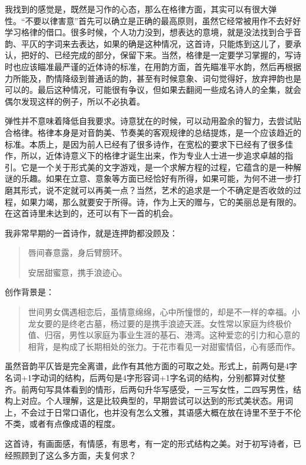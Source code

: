 \documentclass{article}
\begin{document}
我找到的感觉是，既然是习作的心态，那么在格律方面，其实可以有很大弹性。``不要以律害意''首先可以确立是正确的最高原则，虽然它经常被用作不去好好学习格律的借口。很多时候，个人功力没到，想表达的意境，就是没法找到合乎音韵、平仄的字词来去表达，如果的确是这种情况，这首诗，只能炼到这儿了，要承认，把好的、已经完成的部分，保留下来。当然，格律是一定要学习掌握的，写诗时也应该瞄准最严谨的近体诗的标准，在用韵方面，首先瞄准平水韵，然后再根据力所能及，酌情降级到普通话的韵，甚至有时候意象、词句觉得好，放弃押韵也是可以的。最后这种情况，可能很有争议，但如果去翻阅一些成名诗人的全集，就会偶尔发现这样的例子，所以不必执着。

弹性并不意味着降低自我要求。诗意犹在的时候，可以动用盈余的智力，去尝试贴合格律。格律本身是对音韵美、节奏美的客观规律的总结提炼，是一个应该趋近的标准。本质上，是因为前人已经有了很多诗作，在宽松的要求下已经有了很多佳作，所以，近体诗意义下的格律才诞生出来，作为专业人士进一步追求卓越的指引。它是一个关于形式美的文字游戏，是一个求解方程的过程，它蕴含的是一种解谜的乐趣。如果在立意、意象等方面已经恰好有所得，如果可能，为何不进一步打磨其形式，说不定就可以再美一点？当然，艺术的追求是一个不确定是否收敛的过程，如果力竭，那么就要安于所得。诗，作为上天的赠与，它的美丽总是有限的。在这首诗里未达到的，还可以有下一首的机会。

我非常早期的一首诗作，就是连押韵都没顾及：

\begin{quote}
唇间春意露，身后臂膀环。

安居甜蜜意，携手浪迹心。
\end{quote}

创作背景是：

\begin{quote}
世间男女偶遇相恋后，虽情意绵绵，心中所憧憬的，却是不一样的幸福。小龙女要的是终老古墓，杨过要的是携手浪迹天涯。女性常以家庭为终极价值、归宿，男性以家庭为事业生涯的基石、港湾。这种爱恋的引力和心意的相背，是构成了长期相处的张力。于花市看见一对甜蜜情侣，心有感而作。
\end{quote}

虽然音韵平仄皆是完全离谱，此作有其他方面的可取之处。形式上，前两句是4字名词+1字动词的结构，后两句是4字形容词+1字名词的结构，分别都算对仗整齐。前两句写具体看到的情形，后两句升华写感受，一三写女性，二四写男性，结构上对应。个人理解，这是比较典型的，早期尝试可以达到的形式美状态。用词上，不会过于日常口语化，也并没有怎么文雅，其语感大概在放在诗里不至于不伦不类，或者有点像成语的程度。

这首诗，有画面感，有情感，有思考，有一定的形式结构之美。对于初写诗者，已经照顾到了这么多方面，夫复何求？
\end{document}
